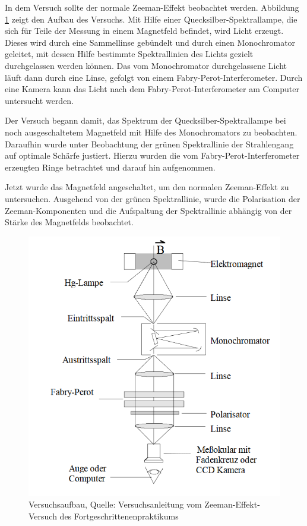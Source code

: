 \documentclass[10pt,a4paper]{article}
\begin{document}
In dem Versuch sollte der normale Zeeman-Effekt beobachtet werden. Abbildung \ref{aufbau} zeigt den Aufbau des Versuchs. Mit Hilfe einer Quecksilber-Spektrallampe, die sich für Teile der Messung in einem Magnetfeld befindet, wird Licht erzeugt. Dieses wird durch eine Sammellinse gebündelt und durch einen Monochromator geleitet, mit dessen Hilfe bestimmte Spektrallinien des Lichts gezielt durchgelassen werden können. Das vom Monochromator durchgelassene Licht läuft dann durch eine Linse, gefolgt von einem Fabry-Perot-Interferometer. Durch eine Kamera kann das Licht nach dem Fabry-Perot-Interferometer am Computer untersucht werden. 

Der Versuch begann damit, das Spektrum der Quecksilber-Spektrallampe bei noch ausgeschaltetem Magnetfeld mit Hilfe des Monochromators zu beobachten. Daraufhin wurde unter Beobachtung der grünen Spektrallinie der Strahlengang auf optimale Schärfe justiert. Hierzu wurden die vom Fabry-Perot-Interferometer erzeugten Ringe betrachtet und darauf hin aufgenommen.

Jetzt wurde das Magnetfeld angeschaltet, um den normalen Zeeman-Effekt zu untersuchen. Ausgehend von der grünen Spektrallinie, wurde die Polarisation der Zeeman-Komponenten und die Aufspaltung der Spektrallinie abhängig von der Stärke des Magnetfelds beobachtet.

\begin{figure}[h]
	\includegraphics[scale = 1]{Zeeman_aufbau.png}
	\centering
	\caption{Versuchsaufbau, Quelle: Versuchsanleitung vom Zeeman-Effekt-Versuch des Fortgeschrittenenpraktikums}
	\label{aufbau}
\end{figure}
\end{document}
